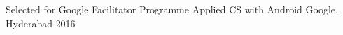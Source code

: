 



\begin{cvhonors}

  \cvhonor
    {Selected for Google Facilitator Programme} %
    {Applied CS with Android} %
    {Google, Hyderabad} %
    {2016} %

  

\end{cvhonors}
